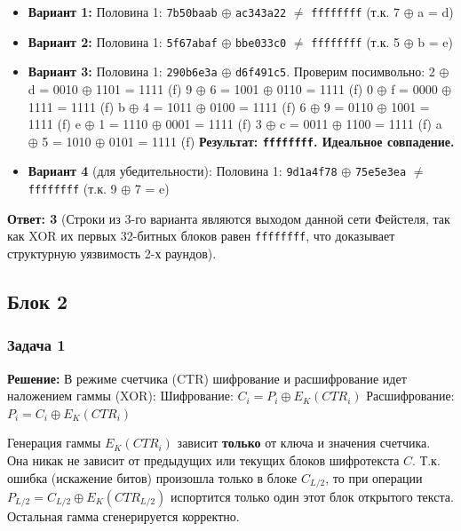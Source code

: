 ﻿\documentclass[9pt,a4paper]{extarticle}
\begin{document}
\begin{enumerate}
  \begin{itemize}
  \item
    \textbf{Вариант 1:} Половина 1: \texttt{7b50baab} \(\oplus\) \texttt{ac343a22} \(\neq\) \texttt{ffffffff} (т.к. 7 \(\oplus\) a = d)
  \item
    \textbf{Вариант 2:} Половина 1: \texttt{5f67abaf} \(\oplus\) \texttt{bbe033c0} \(\neq\) \texttt{ffffffff} (т.к. 5 \(\oplus\) b = e)
  \item
    \textbf{Вариант 3:} Половина 1: \texttt{290b6e3a} \(\oplus\) \texttt{d6f491c5}. Проверим посимвольно: 2 \(\oplus\) d = 0010 \(\oplus\) 1101 = 1111 (f) 9 \(\oplus\) 6 = 1001 \(\oplus\) 0110 = 1111 (f) 0 \(\oplus\) f = 0000 \(\oplus\) 1111 = 1111 (f) b \(\oplus\) 4 = 1011 \(\oplus\) 0100 = 1111 (f) 6 \(\oplus\) 9 = 0110 \(\oplus\) 1001 = 1111 (f) e \(\oplus\) 1 = 1110 \(\oplus\) 0001 = 1111 (f) 3 \(\oplus\) c = 0011 \(\oplus\) 1100 = 1111 (f) a \(\oplus\) 5 = 1010 \(\oplus\) 0101 = 1111 (f) \textbf{Результат: \texttt{ffffffff}. Идеальное совпадение.}
  \item
    \textbf{Вариант 4} (для убедительности): Половина 1: \texttt{9d1a4f78} \(\oplus\) \texttt{75e5e3ea} \(\neq\) \texttt{ffffffff} (т.к. 9 \(\oplus\) 7 = e)
  \end{itemize}
\end{enumerate}

\textbf{Ответ: 3} (Строки из 3-го варианта являются выходом данной сети Фейстеля, так как XOR их первых 32-битных блоков равен \texttt{ffffffff}, что доказывает структурную уязвимость 2-х раундов).

\subsection{Блок 2}\label{ux431ux43bux43eux43a-2}

\subsubsection{Задача 1}\label{ux437ux430ux434ux430ux447ux430-1}

\textbf{Решение:} В режиме счетчика (CTR) шифрование и расшифрование идет наложением гаммы (XOR): Шифрование: \(C_i = P_i \oplus E_K(CTR_i)\) Расшифрование: \(P_i = C_i \oplus E_K(CTR_i)\)

Генерация гаммы \(E_K(CTR_i)\) зависит \textbf{только} от ключа и значения счетчика. Она никак не зависит от предыдущих или текущих блоков шифротекста \(C\). Т.к. ошибка (искажение битов) произошла только в блоке \(C_{L/2}\), то при операции \(P_{L/2} = C_{L/2} \oplus E_K(CTR_{L/2})\) испортится только один этот блок открытого текста. Остальная гамма сгенерируется корректно.
\end{document}
